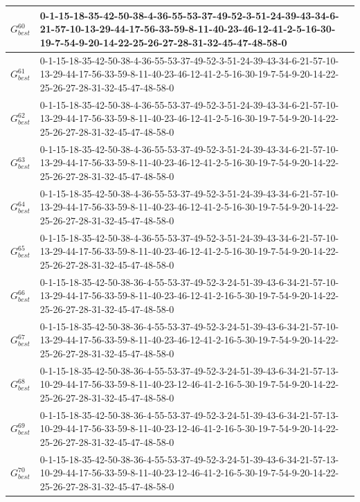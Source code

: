 \begin{landscape}
{\begin{tabularx}{\linewidth}{|c|X|}
        $G_{best}^{60}$  & 0-1-15-18-35-42-50-38-4-36-55-53-37-49-52-3-51-24-39-43-34-6-21-57-10-13-29-44-17-56-33-59-8-11-40-23-46-12-41-2-5-16-30-19-7-54-9-20-14-22-25-26-27-28-31-32-45-47-48-58-0 \\ \hline
        $G_{best}^{61}$  & 0-1-15-18-35-42-50-38-4-36-55-53-37-49-52-3-51-24-39-43-34-6-21-57-10-13-29-44-17-56-33-59-8-11-40-23-46-12-41-2-5-16-30-19-7-54-9-20-14-22-25-26-27-28-31-32-45-47-48-58-0 \\ \hline
        $G_{best}^{62}$  & 0-1-15-18-35-42-50-38-4-36-55-53-37-49-52-3-51-24-39-43-34-6-21-57-10-13-29-44-17-56-33-59-8-11-40-23-46-12-41-2-5-16-30-19-7-54-9-20-14-22-25-26-27-28-31-32-45-47-48-58-0 \\ \hline
        $G_{best}^{63}$  & 0-1-15-18-35-42-50-38-4-36-55-53-37-49-52-3-51-24-39-43-34-6-21-57-10-13-29-44-17-56-33-59-8-11-40-23-46-12-41-2-5-16-30-19-7-54-9-20-14-22-25-26-27-28-31-32-45-47-48-58-0 \\ \hline
        $G_{best}^{64}$  & 0-1-15-18-35-42-50-38-4-36-55-53-37-49-52-3-51-24-39-43-34-6-21-57-10-13-29-44-17-56-33-59-8-11-40-23-46-12-41-2-5-16-30-19-7-54-9-20-14-22-25-26-27-28-31-32-45-47-48-58-0 \\ \hline
        $G_{best}^{65}$  & 0-1-15-18-35-42-50-38-4-36-55-53-37-49-52-3-51-24-39-43-34-6-21-57-10-13-29-44-17-56-33-59-8-11-40-23-46-12-41-2-5-16-30-19-7-54-9-20-14-22-25-26-27-28-31-32-45-47-48-58-0 \\ \hline
        $G_{best}^{66}$  & 0-1-15-18-35-42-50-38-36-4-55-53-37-49-52-3-24-51-39-43-6-34-21-57-10-13-29-44-17-56-33-59-8-11-40-23-46-12-41-2-16-5-30-19-7-54-9-20-14-22-25-26-27-28-31-32-45-47-48-58-0 \\ \hline
        $G_{best}^{67}$  & 0-1-15-18-35-42-50-38-36-4-55-53-37-49-52-3-24-51-39-43-6-34-21-57-10-13-29-44-17-56-33-59-8-11-40-23-46-12-41-2-16-5-30-19-7-54-9-20-14-22-25-26-27-28-31-32-45-47-48-58-0 \\ \hline
        $G_{best}^{68}$  & 0-1-15-18-35-42-50-38-36-4-55-53-37-49-52-3-24-51-39-43-6-34-21-57-13-10-29-44-17-56-33-59-8-11-40-23-12-46-41-2-16-5-30-19-7-54-9-20-14-22-25-26-27-28-31-32-45-47-48-58-0 \\ \hline
        $G_{best}^{69}$  & 0-1-15-18-35-42-50-38-36-4-55-53-37-49-52-3-24-51-39-43-6-34-21-57-13-10-29-44-17-56-33-59-8-11-40-23-12-46-41-2-16-5-30-19-7-54-9-20-14-22-25-26-27-28-31-32-45-47-48-58-0 \\ \hline
        $G_{best}^{70}$  & 0-1-15-18-35-42-50-38-36-4-55-53-37-49-52-3-24-51-39-43-6-34-21-57-13-10-29-44-17-56-33-59-8-11-40-23-12-46-41-2-16-5-30-19-7-54-9-20-14-22-25-26-27-28-31-32-45-47-48-58-0 \\ \hline

\end{tabularx}}
\end{landscape}
